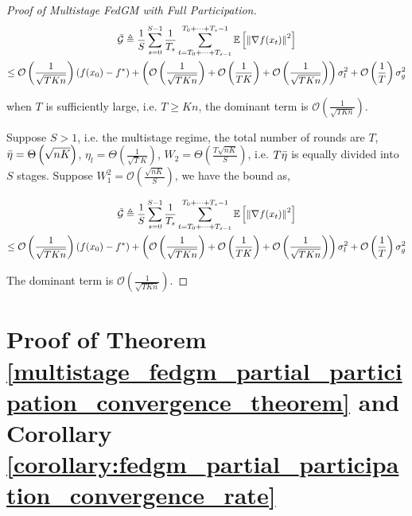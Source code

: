 \begin{proof}[Proof of Multistage FedGM with Full Participation]
\begin{equation}
\begin{gathered}
\Bar{\mathcal{G}}\triangleq\frac{1}{S}\sum_{s=0}^{S-1} \frac{1}{T_s}\sum_{t=T_0+\dots+T_{s-1} }^{T_0+\dots+T_s-1} \mathbb{E}\left[\left\|\nabla f(x_t)\right\|^2\right]\\
\leq  \mathcal{O}\left(\frac{1}{\sqrt{TKn}}\right) \left(f(x_0)-f^\ast\right) + \left(\mathcal{O}\left(\frac{1}{\sqrt{TKn}}\right)+ \mathcal{O}\left(\frac{1}{TK}\right) + \mathcal{O}\left(\frac{1}{\sqrt{TKn}}\right) \right)  \sigma_l^2+
\mathcal{O}\left(\frac{1}{T}\right) \sigma_g^2
\end{gathered}\nonumber
\end{equation}

when $T$ is sufficiently large, i.e. $T\ge Kn$, the dominant term is $\mathcal{O}\left(\frac{1}{\sqrt{TKn}}\right)$.

Suppose $S>1$, i.e. the multistage regime, the total number of rounds are $T$, $\Bar{\eta} = \Theta\left(\sqrt{nK}\right)$, $\eta_l=\Theta\left(\frac{1}{\sqrt{T}K}\right)$, $W_2=\Theta\left(\frac{T\sqrt{nK}}{S}\right)$, i.e. $T\Bar{\eta}$ is equally divided into $S$ stages. Suppose $W_1^2=\mathcal{O}\left(\frac{\sqrt{nK}}{S}\right)$, we have the bound as,

\begin{equation}
\begin{gathered}
\Bar{\mathcal{G}}\triangleq\frac{1}{S}\sum_{s=0}^{S-1} \frac{1}{T_s}\sum_{t=T_0+\dots+T_{s-1} }^{T_0+\dots+T_s-1} \mathbb{E}\left[\left\|\nabla f(x_t)\right\|^2\right]\\
\leq  \mathcal{O}\left(\frac{1}{\sqrt{TKn}}\right) \left(f(x_0)-f^\ast\right) + \left(\mathcal{O}\left(\frac{1}{\sqrt{TKn}}\right)+ \mathcal{O}\left(\frac{1}{TK}\right) + \mathcal{O}\left(\frac{1}{\sqrt{TKn}}\right) \right)  \sigma_l^2+
\mathcal{O}\left(\frac{1}{T}\right) \sigma_g^2
\end{gathered}\nonumber
\end{equation}

The dominant term is $\mathcal{O}\left(\frac{1}{\sqrt{TKn}}\right)$.

\end{proof}


\section{Proof of Theorem \ref{multistage_fedgm_partial_participation_convergence_theorem} and Corollary \ref{corollary:fedgm_partial_participation_convergence_rate}}
\label{sec:proof_multistage_fedgm_partial_participation}

